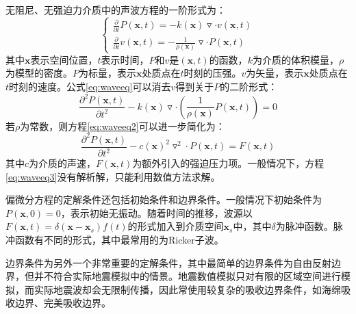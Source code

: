 \documentclass[degree=doctor]{thuthesis}
\begin{document}
无阻尼、无强迫力介质中的声波方程的一阶形式为：
\begin{equation}
\left\{\begin{matrix}
\frac{\partial}{\partial t}P(\textbf{x},t) = -k(\textbf{x}) \triangledown \cdot v(\textbf{x}, t) \\
\frac{\partial}{\partial t}v(\textbf{x},t) = -\frac{1}{\rho(\textbf{x})} \triangledown \cdot P(\textbf{x}, t)
\end{matrix}\right.
\label{eq:waveeq}
\end{equation}
其中$\textbf{x}$表示空间位置，$t$表示时间，$P$和$v$是$(\textbf{x},t)$的函数，$k$为介质的体积模量，$\rho$为模型的密度。$P$为标量，表示$\textbf{x}$处质点在$t$时刻的压强。$v$为矢量，表示$\textbf{x}$处质点在$t$时刻的速度。公式\ref{eq:waveeq}可以消去$v$得到关于$P$的二阶形式：
\begin{equation}
  \frac{\partial ^2P(\textbf{x},t)}{\partial t^2} - k(\textbf{x})\triangledown \cdot (\frac{1}{\rho(\textbf{x})}P(\textbf{x},t))=0
  \label{eq:waveeq2}
\end{equation}
若$\rho$为常数，则方程\ref{eq:waveeq2}可以进一步简化为：
\begin{equation}
    \frac{\partial ^2P(\textbf{x},t)}{\partial t^2} - c(\textbf{x})^2\triangledown ^2 \cdot P(\textbf{x},t)=F(\textbf{x}, t)
  \label{eq:waveeq3}
\end{equation}
其中$c$为介质的声速，$F(\textbf{x}, t)$为额外引入的强迫压力项。一般情况下，方程\ref{eq:waveeq3}没有解析解，只能利用数值方法求解。

偏微分方程的定解条件还包括初始条件和边界条件。一般情况下初始条件为$P(\textbf{x},0)=0$，表示初始无振动。随着时间的推移，波源以$F(\textbf{x},t)=\delta(\textbf{x}-\textbf{x}_s)f(t)$的形式加入到介质空间$\textbf{x}_s$中，其中$\delta$为脉冲函数。脉冲函数有不同的形式，其中最常用的为Ricker子波。

边界条件为另外一个非常重要的定解条件，其中最简单的边界条件为自由反射边界，但并不符合实际地震模拟中的情景。地震数值模拟只对有限的区域空间进行模拟，而实际地震波却会无限制传播，因此常使用较复杂的吸收边界条件，如海绵吸收边界\cite{cerjan1985nonreflecting}、完美吸收边界\cite{berenger1994perfectly}。

\end{document}
